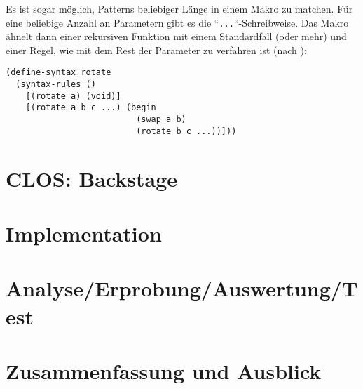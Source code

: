 Es ist sogar möglich, Patterns beliebiger Länge in einem Makro zu matchen. Für eine beliebige Anzahl an Parametern gibt es die ``\texttt{...}``-Schreibweise. Das Makro ähnelt dann einer rekursiven Funktion mit einem Standardfall (oder mehr) und einer Regel, wie mit dem Rest der Parameter zu verfahren ist (nach \cite{racketguide-macros}):

\begin{lstlisting}
(define-syntax rotate
  (syntax-rules ()
    [(rotate a) (void)]
    [(rotate a b c ...) (begin
                          (swap a b)
                          (rotate b c ...))]))
\end{lstlisting}


% 
% 


\chapter{CLOS: Backstage}
\label{cpl}


\chapter{Implementation}  %

\chapter{Analyse/Erprobung/Auswertung/Test}

\chapter{Zusammenfassung und Ausblick}






